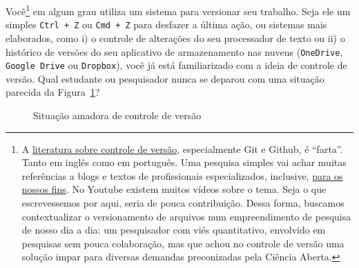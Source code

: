 \documentclass[
  a4paper,
]{book}
\begin{document}
Você\footnote{A \href{https://git-scm.com/book/en/v2}{literatura sobre
  controle de versão}, especialmente Git e Github, é ``farta''. Tanto em
  inglês como em português. Uma pesquisa simples vai achar muitas
  referências a blogs e textos de profissionais especializados,
  inclusive, \href{https://happygitwithr.com/}{para os nossos fins}. No
  Youtube existem muitos vídeos sobre o tema. Seja o que escrevessemos
  por aqui, seria de pouca contribuição. Dessa forma, buscamos
  contextualizar o versionamento de arquivos num empreendimento de
  pesquisa de nosso dia a dia: um pesquisador com viés quantitativo,
  envolvido em pesquisas sem pouca colaboração, mas que achou no
  controle de versão uma solução impar para diversas demandas
  preconizadas pela Ciência Aberta.} em algum grau utiliza um sistema
para versionar seu trabalho. Seja ele um simples \texttt{Ctrl\ +\ Z} ou
\texttt{Cmd\ +\ Z} para desfazer a última ação, ou sistemas mais
elaborados, como i) o controle de alterações do seu processador de texto
ou ii) o histórico de versões do seu aplicativo de armazenamento nas
nuvens (\texttt{OneDrive}, \texttt{Google\ Drive} ou \texttt{Dropbox}),
você já está familiarizado com a ideia de controle de versão. Qual
estudante ou pesquisador nunca se deparou com uma situação parecida da
Figura~\ref{fig-funny-git}?

\begin{figure}


\caption{\label{fig-funny-git}Situação amadora de controle de versão}

\end{figure}%
\end{document}
